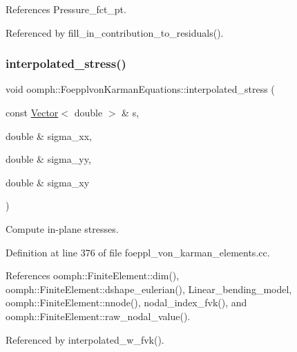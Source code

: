 References Pressure\+\_\+fct\+\_\+pt.



Referenced by fill\+\_\+in\+\_\+contribution\+\_\+to\+\_\+residuals().

\mbox{\label{classoomph_1_1FoepplvonKarmanEquations_ad5dae45475795bac40f5665391e1217e}} 
\subsubsection{\texorpdfstring{interpolated\+\_\+stress()}{interpolated\_stress()}}
{\footnotesize\ttfamily void oomph\+::\+Foepplvon\+Karman\+Equations\+::interpolated\+\_\+stress (\begin{DoxyParamCaption}\item[{const \hyperlink{classoomph_1_1Vector}{Vector}$<$ double $>$ \&}]{s,  }\item[{double \&}]{sigma\+\_\+xx,  }\item[{double \&}]{sigma\+\_\+yy,  }\item[{double \&}]{sigma\+\_\+xy }\end{DoxyParamCaption})}



Compute in-\/plane stresses. 



Definition at line 376 of file foeppl\+\_\+von\+\_\+karman\+\_\+elements.\+cc.



References oomph\+::\+Finite\+Element\+::dim(), oomph\+::\+Finite\+Element\+::dshape\+\_\+eulerian(), Linear\+\_\+bending\+\_\+model, oomph\+::\+Finite\+Element\+::nnode(), nodal\+\_\+index\+\_\+fvk(), and oomph\+::\+Finite\+Element\+::raw\+\_\+nodal\+\_\+value().



Referenced by interpolated\+\_\+w\+\_\+fvk().

\mbox{\label{classoomph_1_1FoepplvonKarmanEquations_a1a132ca2041cc236704ff4db2974dfc9}} 
